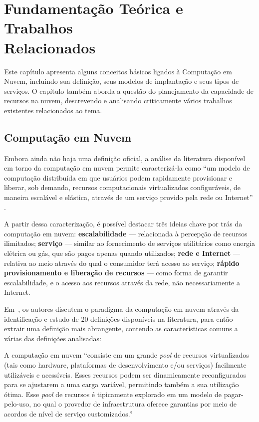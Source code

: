 \chapter[Fundamentação Teórica e Trabalhos Relacionados]{Fundamentação Teórica e Trabalhos\\Relacionados}

Este capítulo apresenta alguns conceitos básicos ligados à Computação em Nuvem, incluindo sua definição, seus modelos de implantação e seus tipos de serviços. O capítulo também aborda a questão do planejamento da capacidade de recursos na nuvem, descrevendo e analisando criticamente vários trabalhos existentes relacionados ao tema.

\section{Computação em Nuvem}
Embora ainda não haja uma definição oficial, a análise da literatura disponível 
em torno da computação em nuvem permite caracterizá-la como ``um modelo de computação 
distribuída em que usuários podem rapidamente provisionar e liberar, sob demanda, recursos 
computacionais virtualizados configuráveis, de maneira escalável e elástica, através 
de um serviço provido pela rede ou Internet'' 
\cite{foster2009cloud,cearley2010case,mell2011nist}. 

A partir dessa caracterização, é possível destacar três ideias chave por trás da computação em nuvem: \textbf{escalabilidade} --- 
relacionada à percepção de recursos ilimitados; \textbf{serviço} --- similar ao 
fornecimento de serviços utilitários como energia elétrica ou gás, que são pagos 
apenas quando utilizados; \textbf{rede e Internet} --- relativa ao meio através do qual o 
consumidor terá acesso ao serviço; \textbf{rápido provisionamento e liberação de recursos}
 --- como forma de garantir escalabilidade, e o acesso aos recursos através da rede, não
necessariamente a Internet.

Em~\cite{vaquero2008break}, os autores discutem o paradigma da computação em
nuvem através da identificação e estudo de 20 definições disponíveis na literatura, 
para então extrair uma definição mais abrangente, contendo as características comuns 
a várias das definições analisadas:

\begin{citacao}
A computação em nuvem ``consiste em um grande \emph{pool} de recursos virtualizados 
(tais como hardware, plataformas de desenvolvimento e/ou serviços) facilmente 
utilizáveis e acessíveis. Esses recursos podem ser dinamicamente reconfigurados 
para se ajustarem a uma carga variável, permitindo também a sua utilização ótima. 
Esse \emph{pool} de recursos é tipicamente explorado em um modelo de pagar-pelo-uso, 
no qual o provedor de infraestrutura oferece garantias por meio de acordos de nível 
de serviço customizados.''\end{citacao}

